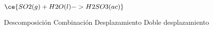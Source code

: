 $\ce{SO2(g) + H2O(l) -> H2SO3(ac)}$

\begin{choices}
    \choice Descomposición
    \CorrectChoice Combinación
    \choice Desplazamiento
    \choice Doble desplazamiento
\end{choices}